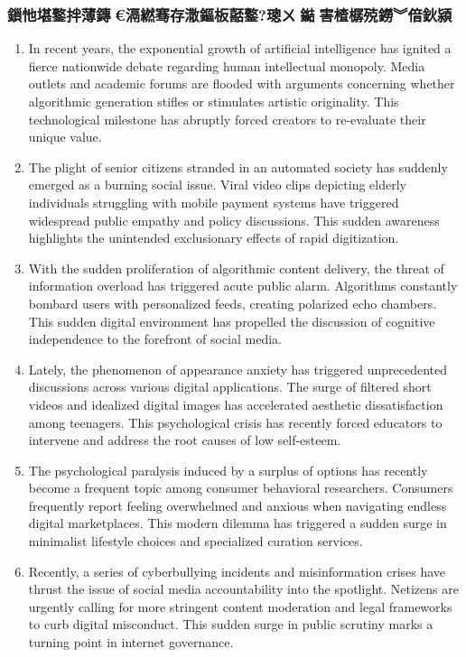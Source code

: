 ﻿\documentclass[lang=cn,11pt]{elegantbook}
\begin{document}
\subsubsection{鎻忚堪鐜拌薄鏄€滆繎骞存潵鏂板嚭鐜?璁ㄨ鐑害楂樼殑鐒︾偣鈥潁}

\begin{enumerate}
\item In recent years, the exponential growth of artificial intelligence has ignited a fierce nationwide debate regarding human intellectual monopoly. Media outlets and academic forums are flooded with arguments concerning whether algorithmic generation stifles or stimulates artistic originality. This technological milestone has abruptly forced creators to re-evaluate their unique value. 
\item The plight of senior citizens stranded in an automated society has suddenly emerged as a burning social issue. Viral video clips depicting elderly individuals struggling with mobile payment systems have triggered widespread public empathy and policy discussions. This sudden awareness highlights the unintended exclusionary effects of rapid digitization.
\item With the sudden proliferation of algorithmic content delivery, the threat of information overload has triggered acute public alarm. Algorithms constantly bombard users with personalized feeds, creating polarized echo chambers. This sudden digital environment has propelled the discussion of cognitive independence to the forefront of social media.
\item Lately, the phenomenon of appearance anxiety has triggered unprecedented discussions across various digital applications. The surge of filtered short videos and idealized digital images has accelerated aesthetic dissatisfaction among teenagers. This psychological crisis has recently forced educators to intervene and address the root causes of low self-esteem. 
\item The psychological paralysis induced by a surplus of options has recently become a frequent topic among consumer behavioral researchers. Consumers frequently report feeling overwhelmed and anxious when navigating endless digital marketplaces. This modern dilemma has triggered a sudden surge in minimalist lifestyle choices and specialized curation services. 
\item Recently, a series of cyberbullying incidents and misinformation crises have thrust the issue of social media accountability into the spotlight. Netizens are urgently calling for more stringent content moderation and legal frameworks to curb digital misconduct. This sudden surge in public scrutiny marks a turning point in internet governance. 

\end{enumerate}
\end{document}
